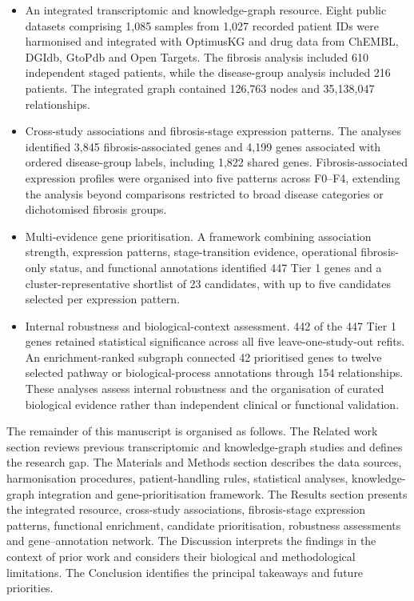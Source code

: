 \documentclass[11pt,a4paper]{article}
\begin{document}
\begin{itemize}
    \item An integrated transcriptomic and knowledge-graph resource. Eight public datasets comprising 1,085 samples from 1,027 recorded patient IDs were harmonised and integrated with OptimusKG and drug data from ChEMBL, DGIdb, GtoPdb and Open Targets. The fibrosis analysis included 610 independent staged patients, while the disease-group analysis included 216 patients. The integrated graph contained 126,763 nodes and 35,138,047 relationships.

    \item Cross-study associations and fibrosis-stage expression patterns. The analyses identified 3,845 fibrosis-associated genes and 4,199 genes associated with ordered disease-group labels, including 1,822 shared genes. Fibrosis-associated expression profiles were organised into five patterns across F0--F4, extending the analysis beyond comparisons restricted to broad disease categories or dichotomised fibrosis groups.

    \item Multi-evidence gene prioritisation. A framework combining association strength, expression patterns, stage-transition evidence, operational fibrosis-only status, and functional annotations identified 447 Tier 1 genes and a cluster-representative shortlist of 23 candidates, with up to five candidates selected per expression pattern.

    \item Internal robustness and biological-context assessment. 442 of the 447 Tier 1 genes retained statistical significance across all five leave-one-study-out refits. An enrichment-ranked subgraph connected 42 prioritised genes to twelve selected pathway or biological-process annotations through 154 relationships. These analyses assess internal robustness and the organisation of curated biological evidence rather than independent clinical or functional validation.
\end{itemize}

The remainder of this manuscript is organised as follows. The Related work section reviews previous transcriptomic and knowledge-graph studies and defines the research gap. The Materials and Methods section describes the data sources, harmonisation procedures, patient-handling rules, statistical analyses, knowledge-graph integration and gene-prioritisation framework. The Results section presents the integrated resource, cross-study associations, fibrosis-stage expression patterns, functional enrichment, candidate prioritisation, robustness assessments and gene--annotation network. The Discussion interprets the findings in the context of prior work and considers their biological and methodological limitations. The Conclusion identifies the principal takeaways and future priorities.
\end{document}
